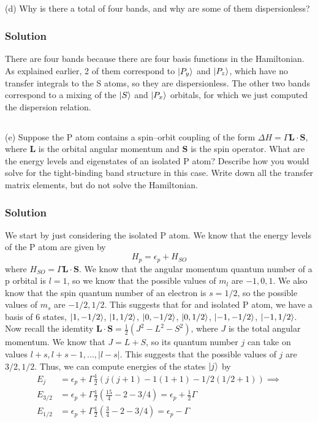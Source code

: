 \documentclass{article}
\begin{document}
\subsection{}
(d) Why is there a total of four bands, and why are some of them dispersionless?\\
\subsubsection{Solution}
There are four bands because there are four basis functions in the Hamiltonian. As explained earlier, 2 of them correspond to $\ket{P_y}$ and $\ket{P_z}$, which have no transfer integrals to the S atoms, so they are dispersionless. The other two bands correspond to a mixing of the $\ket{S}$ and $\ket{P_x}$ orbitals, for which we just computed the dispersion relation.\\
\subsection{}
(e) Suppose the P atom contains a spin–orbit coupling of the form $\Delta H = \Gamma  \mathbf{L} \cdot \mathbf{S}$, where $\mathbf{L}$ is the orbital angular momentum and $\mathbf{S}$ is the spin operator. What are the energy levels and eigenstates of an isolated P atom? Describe how you would solve for the tight-binding band structure in this case. Write down all the transfer matrix elements, but do not solve the Hamiltonian.
\subsubsection{Solution}
We start by just considering the isolated P atom. We know that the energy levels of the P atom are given by
\begin{equation}
    H_p = \epsilon_p + H_{SO}
\end{equation}
where $H_{SO} = \Gamma \mathbf{L} \cdot \mathbf{S}$. We know that the angular momentum quantum number of a p orbital is $l=1$, so we know that the possible values of $m_l$ are $-1, 0, 1$. We also know that the spin quantum number of an electron is $s=1/2$, so the possible values of $m_s$ are $-1/2, 1/2$. This suggests that for and isolated P atom, we have a basis of 6 states, $\ket{1, -1/2}$, $\ket{1, 1/2}$, $\ket{0, -1/2}$, $\ket{0, 1/2}$, $\ket{-1, -1/2}$, $\ket{-1, 1/2}$. Now recall the idemtity $\mathbf{L} \cdot \mathbf{S} = \frac{1}{2}(J^2 - L^2 - S^2)$, where $J$ is the total angular momentum. We know that $J = L + S$, so its quantum  number $j$ can take on values $l+s, l+s-1, ..., |l-s|$. This suggests that the possible values of $j$ are $3/2, 1/2$. Thus, we can compute energies of the states $\ket{j}$ by
\begin{align}
    E_{j} &= \epsilon_p + \Gamma \frac{1}{2} \left(j(j+1) - 1(1+1) - 1/2(1/2+1) \right) \implies\\
    E_{3/2} &= \epsilon_p + \Gamma \frac{1}{2} \left(\frac{15}{4} - 2 - 3/4 \right) = \epsilon_p + \frac{1}{2}\Gamma\\
    E_{1/2} &= \epsilon_p + \Gamma \frac{1}{2} \left(\frac{3}{4} - 2 - 3/4 \right) = \epsilon_p - \Gamma
\end{align}
\end{document}
